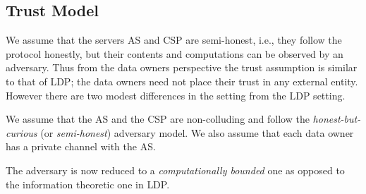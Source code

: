 \subsection{Trust Model}\label{sec:trust}
We assume that the servers \textsf{AS} and \textsf{CSP} are semi-honest, i.e., they follow the protocol honestly, but their contents and computations can be observed by an adversary.
Thus from the data owners perspective the trust assumption is similar to that of \textsf{LDP}; the data owners need not place their trust in any external entity.
However there are two modest differences in the \system setting from the \textsf{LDP} setting.
\squishlist
\item We assume that the \textsf{AS} and the \textsf{CSP} are non-colluding and follow the \emph{honest-but-curious} (or \textit{semi-honest}) adversary model. %
We also assume that each data owner has a private channel with the \textsf{AS}. %
\item The adversary is now reduced to a \textit{computationally bounded} one as opposed to the information theoretic one  in \textsf{LDP}.
 \squishend
{}

